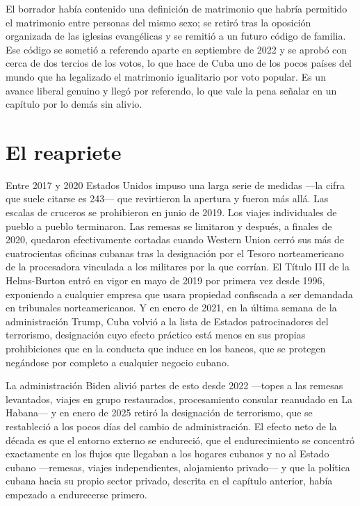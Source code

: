 El borrador había contenido una definición de matrimonio que habría permitido el
matrimonio entre personas del mismo sexo; se retiró tras la oposición organizada de
las iglesias evangélicas y se remitió a un futuro código de familia. Ese código se
sometió a referendo aparte en septiembre de 2022 y se aprobó con cerca de dos
tercios de los votos, lo que hace de Cuba uno de los pocos países del mundo que ha
legalizado el matrimonio igualitario por voto popular. Es un avance liberal genuino
y llegó por referendo, lo que vale la pena señalar en un capítulo por lo demás sin
alivio.

\section{El reapriete}

Entre 2017 y 2020 Estados Unidos impuso una larga serie de medidas ---la cifra que
suele citarse es 243--- que revirtieron la apertura y fueron más allá.\unv{} Las
escalas de cruceros se prohibieron en junio de 2019. Los viajes individuales de
pueblo a pueblo terminaron. Las remesas se limitaron y después, a finales de 2020,
quedaron efectivamente cortadas cuando Western Union cerró sus más de cuatrocientas
oficinas cubanas tras la designación por el Tesoro norteamericano de la procesadora
vinculada a los militares por la que corrían. El Título III de la Helms-Burton
entró en vigor en mayo de 2019 por primera vez desde 1996, exponiendo a cualquier
empresa que usara propiedad confiscada a ser demandada en tribunales
norteamericanos. Y en enero de 2021, en la última semana de la administración
Trump, Cuba volvió a la lista de Estados patrocinadores del terrorismo,
designación cuyo efecto práctico está menos en sus propias prohibiciones que en la
conducta que induce en los bancos, que se protegen negándose por completo a
cualquier negocio cubano.

La administración Biden alivió partes de esto desde 2022 ---topes a las remesas
levantados, viajes en grupo restaurados, procesamiento consular reanudado en La
Habana--- y en enero de 2025 retiró la designación de terrorismo, que se
restableció a los pocos días del cambio de administración. El efecto neto de la
década es que el entorno externo se endureció, que el endurecimiento se concentró
exactamente en los flujos que llegaban a los hogares cubanos y no al Estado cubano
---remesas, viajes independientes, alojamiento privado--- y que la política cubana
hacia su propio sector privado, descrita en el capítulo anterior, había empezado a
endurecerse primero.

